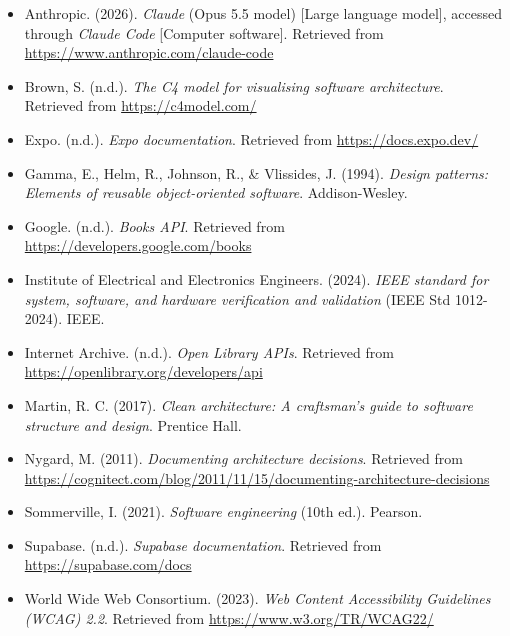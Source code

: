 \documentclass[12pt]{article}
\begin{document}
\begin{itemize}[leftmargin=0.5in, itemindent=-0.5in, labelsep=0in]
\item Anthropic. (2026). \textit{Claude} (Opus 5.5 model) [Large language model], accessed through \textit{Claude Code} [Computer software]. Retrieved from \url{https://www.anthropic.com/claude-code}
\item Brown, S. (n.d.). \textit{The C4 model for visualising software architecture}. Retrieved from \url{https://c4model.com/}
\item Expo. (n.d.). \textit{Expo documentation}. Retrieved from \url{https://docs.expo.dev/}
\item Gamma, E., Helm, R., Johnson, R., \& Vlissides, J. (1994). \textit{Design patterns: Elements of reusable object-oriented software}. Addison-Wesley.
\item Google. (n.d.). \textit{Books API}. Retrieved from \url{https://developers.google.com/books}
\item Institute of Electrical and Electronics Engineers. (2024). \textit{IEEE standard for system, software, and hardware verification and validation} (IEEE Std 1012-2024). IEEE.
\item Internet Archive. (n.d.). \textit{Open Library APIs}. Retrieved from \url{https://openlibrary.org/developers/api}
\item Martin, R. C. (2017). \textit{Clean architecture: A craftsman's guide to software structure and design}. Prentice Hall.
\item Nygard, M. (2011). \textit{Documenting architecture decisions}. Retrieved from \url{https://cognitect.com/blog/2011/11/15/documenting-architecture-decisions}
\item Sommerville, I. (2021). \textit{Software engineering} (10th ed.). Pearson.
\item Supabase. (n.d.). \textit{Supabase documentation}. Retrieved from \url{https://supabase.com/docs}
\item World Wide Web Consortium. (2023). \textit{Web Content Accessibility Guidelines (WCAG) 2.2}. Retrieved from \url{https://www.w3.org/TR/WCAG22/}
\end{itemize}
\end{document}
